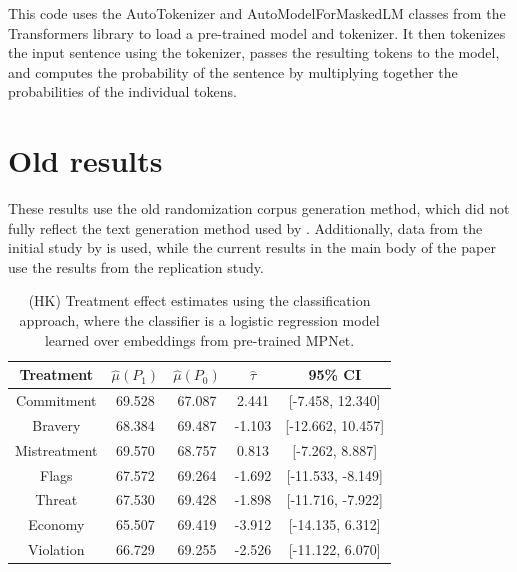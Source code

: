 \documentclass{article}
\begin{document}
This code uses the AutoTokenizer and AutoModelForMaskedLM classes from the Transformers library to load a pre-trained model and tokenizer. It then tokenizes the input sentence using the tokenizer, passes the resulting tokens to the model, and computes the probability of the sentence by multiplying together the probabilities of the individual tokens.

\section{Old results}

These results use the old randomization corpus generation method, which did not fully reflect the text generation method used by \cite{fong2021causal}. Additionally, data from the initial study by \cite{fong2021causal} is used, while the current results in the main body of the paper use the results from the replication study.

\begin{table}[!ht]
    \centering
    \begin{tabular}{c|cccc}
        \toprule
        Treatment & $\hat{\mu}(P_1)$ & $\hat{\mu}(P_0)$ & $\hat{\tau}$ & 95\% CI \\
        \midrule
        Commitment & 69.528 & 67.087 & \textcolor{green!50!black}{2.441} & [-7.458, 12.340] \\
        Bravery & 68.384 & 69.487 & \textcolor{red!80!black}{-1.103} & [-12.662, 10.457] \\
        Mistreatment & 69.570 & 68.757 & \textcolor{green!50!black}{0.813} & [-7.262, 8.887] \\
        Flags & 67.572 & 69.264 & \textcolor{red!80!black}{-1.692} & [-11.533, -8.149] \\
        Threat & 67.530 & 69.428 & \textcolor{red!80!black}{-1.898} & [-11.716, -7.922] \\
        Economy & 65.507 & 69.419 & \textcolor{red!80!black}{-3.912} & [-14.135, 6.312] \\
        Violation & 66.729 & 69.255 & \textcolor{red!80!black}{-2.526} & [-11.122, 6.070] \\
        \bottomrule
    \end{tabular}
    \caption{(HK) Treatment effect estimates using the classification approach, where the classifier is a logistic regression model learned over embeddings from pre-trained MPNet.}
    \label{tab:results_clf1_old}
\end{table}
\end{document}
